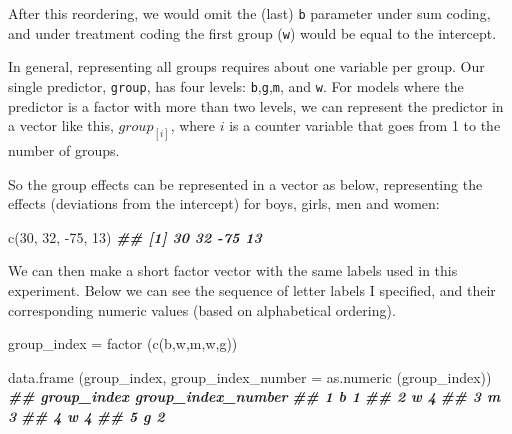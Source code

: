 \documentclass[
]{book}
\newenvironment{Shaded}{\begin{snugshade}}{\end{snugshade}}
\newcommand{\AttributeTok}[1]{\textcolor[rgb]{0.77,0.63,0.00}{#1}}
\newcommand{\DecValTok}[1]{\textcolor[rgb]{0.00,0.00,0.81}{#1}}
\newcommand{\DocumentationTok}[1]{\textcolor[rgb]{0.56,0.35,0.01}{\textbf{\textit{#1}}}}
\newcommand{\FunctionTok}[1]{\textcolor[rgb]{0.00,0.00,0.00}{#1}}
\newcommand{\NormalTok}[1]{#1}
\newcommand{\OtherTok}[1]{\textcolor[rgb]{0.56,0.35,0.01}{#1}}
\newcommand{\SpecialCharTok}[1]{\textcolor[rgb]{0.00,0.00,0.00}{#1}}
\newcommand{\StringTok}[1]{\textcolor[rgb]{0.31,0.60,0.02}{#1}}
\begin{document}
After this reordering, we would omit the (last) \texttt{b} parameter under sum coding, and under treatment coding the first group (\texttt{w}) would be equal to the intercept.

In general, representing all groups requires about one variable per group. Our single predictor, \texttt{group}, has four levels: \texttt{b},\texttt{g},\texttt{m}, and \texttt{w}. For models where the predictor is a factor with more than two levels, we can represent the predictor in a vector like this, \(group_{[i]}\), where \(i\) is a counter variable that goes from 1 to the number of groups.

So the group effects can be represented in a vector as below, representing the effects (deviations from the intercept) for boys, girls, men and women:

\begin{Shaded}
\begin{Highlighting}[]
\FunctionTok{c}\NormalTok{(}\DecValTok{30}\NormalTok{, }\DecValTok{32}\NormalTok{, }\SpecialCharTok{{-}}\DecValTok{75}\NormalTok{, }\DecValTok{13}\NormalTok{)}
\DocumentationTok{\#\# [1]  30  32 {-}75  13}
\end{Highlighting}
\end{Shaded}

We can then make a short factor vector with the same labels used in this experiment. Below we can see the sequence of letter labels I specified, and their corresponding numeric values (based on alphabetical ordering).

\begin{Shaded}
\begin{Highlighting}[]
\NormalTok{group\_index }\OtherTok{=} \FunctionTok{factor}\NormalTok{ (}\FunctionTok{c}\NormalTok{(}\StringTok{\textquotesingle{}b\textquotesingle{}}\NormalTok{,}\StringTok{\textquotesingle{}w\textquotesingle{}}\NormalTok{,}\StringTok{\textquotesingle{}m\textquotesingle{}}\NormalTok{,}\StringTok{\textquotesingle{}w\textquotesingle{}}\NormalTok{,}\StringTok{\textquotesingle{}g\textquotesingle{}}\NormalTok{))}

\FunctionTok{data.frame}\NormalTok{ (group\_index, }\AttributeTok{group\_index\_number =} \FunctionTok{as.numeric}\NormalTok{ (group\_index))}
\DocumentationTok{\#\#   group\_index group\_index\_number}
\DocumentationTok{\#\# 1           b                  1}
\DocumentationTok{\#\# 2           w                  4}
\DocumentationTok{\#\# 3           m                  3}
\DocumentationTok{\#\# 4           w                  4}
\DocumentationTok{\#\# 5           g                  2}
\end{Highlighting}
\end{Shaded}
\end{document}
